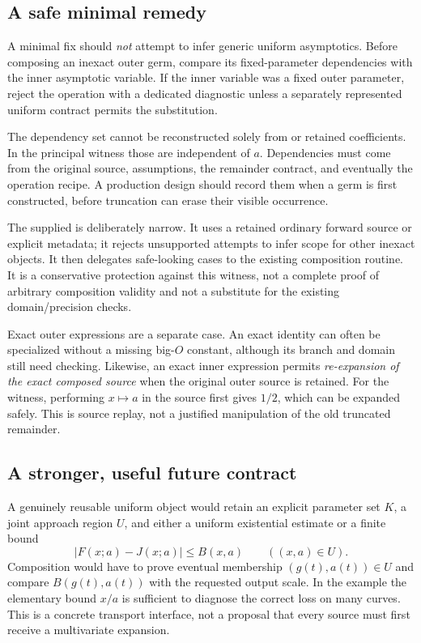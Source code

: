 \documentclass[11pt,a4paper]{article}
\newcommand{\code}[1]{\texttt{\detokenize{#1}}}
\begin{document}
\subsection{A safe minimal remedy}

A minimal fix should \emph{not} attempt to infer generic uniform asymptotics. Before composing an inexact outer germ, compare its fixed-parameter dependencies with the inner asymptotic variable. If the inner variable was a fixed outer parameter, reject the operation with a dedicated diagnostic unless a separately represented uniform contract permits the substitution.

The dependency set cannot be reconstructed solely from \code{Normal[outer]} or retained coefficients. In the principal witness those are independent of $a$. Dependencies must come from the original source, assumptions, the remainder contract, and eventually the operation recipe. A production design should record them when a germ is first constructed, before truncation can erase their visible occurrence.

The supplied \code{ParameterSafeCompose} is deliberately narrow. It uses a retained ordinary forward source or explicit \code{FixedParameters} metadata; it rejects unsupported attempts to infer scope for other inexact objects. It then delegates safe-looking cases to the existing composition routine. It is a conservative protection against this witness, not a complete proof of arbitrary composition validity and not a substitute for the existing domain/precision checks.

Exact outer expressions are a separate case. An exact identity can often be specialized without a missing big-$O$ constant, although its branch and domain still need checking. Likewise, an exact inner expression permits \emph{re-expansion of the exact composed source} when the original outer source is retained. For the witness, performing $x\mapsto a$ in the source first gives $1/2$, which can be expanded safely. This is source replay, not a justified manipulation of the old truncated remainder.

\subsection{A stronger, useful future contract}

A genuinely reusable uniform object would retain an explicit parameter set $K$, a joint approach region $U$, and either a uniform existential estimate or a finite bound
\begin{equation}
 |F(x;a)-J(x;a)|\le B(x,a)\qquad ((x,a)\in U).
\end{equation}
Composition would have to prove eventual membership $(g(t),a(t))\in U$ and compare $B(g(t),a(t))$ with the requested output scale. In the example the elementary bound $x/a$ is sufficient to diagnose the correct loss on many curves. This is a concrete transport interface, not a proposal that every source must first receive a multivariate expansion.
\end{document}
